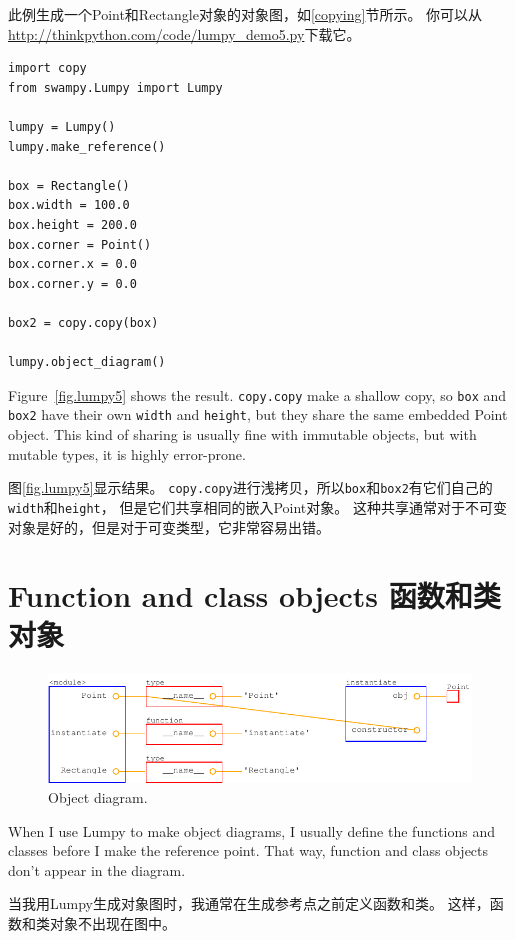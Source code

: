 \documentclass[10pt]{book}
\begin{document}
\begin{CJK}{UTF8}{gbsn}
此例生成一个Point和Rectangle对象的对象图，如\ref{copying}节所示。
你可以从\url{http://thinkpython.com/code/lumpy_demo5.py}下载它。

\begin{verbatim}
import copy
from swampy.Lumpy import Lumpy

lumpy = Lumpy()
lumpy.make_reference()

box = Rectangle()
box.width = 100.0
box.height = 200.0
box.corner = Point()
box.corner.x = 0.0
box.corner.y = 0.0

box2 = copy.copy(box)

lumpy.object_diagram()
\end{verbatim}

Figure~\ref{fig.lumpy5} shows the result.  {\tt copy.copy} make a
shallow copy, so {\tt box} and {\tt box2} have their own {\tt width}
and {\tt height}, but they share the same embedded Point object.  This
kind of sharing is usually fine with immutable objects, but with
mutable types, it is highly error-prone.

图\ref{fig.lumpy5}显示结果。
{\tt copy.copy}进行浅拷贝，所以{\tt box}和{\tt box2}有它们自己的{\tt width}和{\tt height}，
但是它们共享相同的嵌入Point对象。
这种共享通常对于不可变对象是好的，但是对于可变类型，它非常容易出错。

\section{Function and class objects 函数和类对象}

\begin{figure}
\centerline
{\includegraphics[scale=0.7]{figs/lumpydemo6.pdf}}
\caption{Object diagram.}
\label{fig.lumpy6}
\end{figure}

When I use Lumpy to make object diagrams, I usually define the functions
and classes before I make the reference point.  That way, function
and class objects don't appear in the diagram.

当我用Lumpy生成对象图时，我通常在生成参考点之前定义函数和类。
这样，函数和类对象不出现在图中。


\end{CJK}
\end{document}
